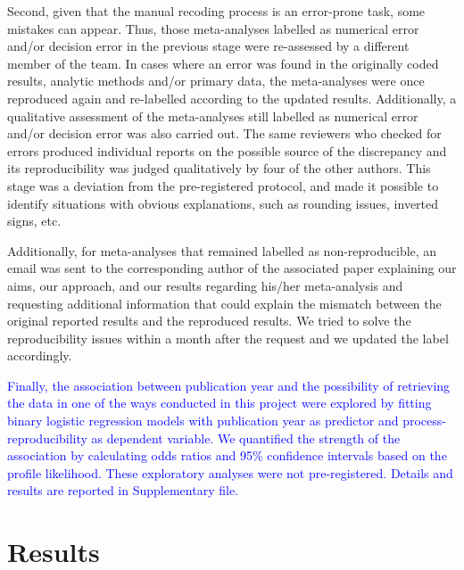 \documentclass[
  ,man,floatsintext]{apa6}
\begin{document}
Second, given that the manual recoding process is an error-prone task, some mistakes can appear. Thus, those meta-analyses labelled as numerical error and/or decision error in the previous stage were re-assessed by a different member of the team. In cases where an error was found in the originally coded results, analytic methods and/or primary data, the meta-analyses were once reproduced again and re-labelled according to the updated results. Additionally, a qualitative assessment of the meta-analyses still labelled as numerical error and/or decision error was also carried out. The same reviewers who checked for errors produced individual reports on the possible source of the discrepancy and its reproducibility was judged qualitatively by four of the other authors. This stage was a deviation from the pre-registered protocol, and made it possible to identify situations with obvious explanations, such as rounding issues, inverted signs, etc.

Additionally, for meta-analyses that remained labelled as non-reproducible, an email was sent to the corresponding author of the associated paper explaining our aims, our approach, and our results regarding his/her meta-analysis and requesting additional information that could explain the mismatch between the original reported results and the reproduced results. We tried to solve the reproducibility issues within a month after the request and we updated the label accordingly.

\textcolor{blue}{Finally, the association between publication year and the possibility of retrieving the data in one of the ways conducted in this project were explored by fitting binary logistic regression models with publication year as predictor and process-reproducibility as dependent variable. We quantified the strength of the association by calculating odds ratios and 95\% confidence intervals based on the profile likelihood. These exploratory analyses were  not pre-registered. Details and results are reported in Supplementary file.}

\hypertarget{results}{%
\section{Results}\label{results}}
\end{document}
